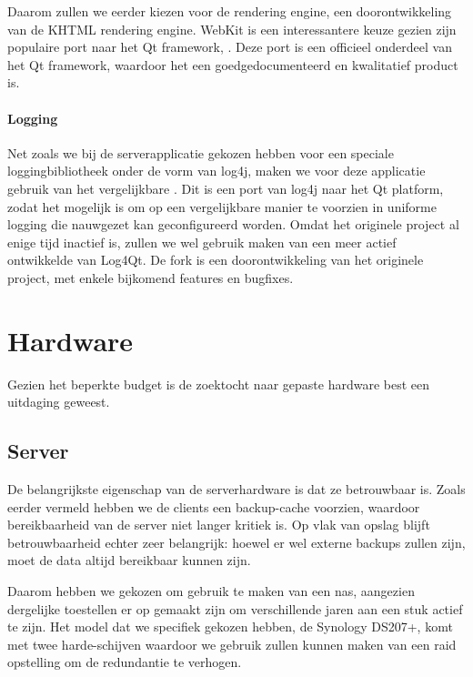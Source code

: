 Daarom zullen we eerder kiezen voor de  rendering engine, een doorontwikkeling van de KHTML rendering engine. WebKit is een interessantere keuze gezien zijn populaire port naar het Qt framework, . Deze port is een officieel onderdeel van het Qt framework, waardoor het een goedgedocumenteerd en kwalitatief product is.

\subsubsection{Logging}

Net zoals we bij de serverapplicatie gekozen hebben voor een speciale loggingbibliotheek onder de vorm van log4j, maken we voor deze applicatie gebruik van het vergelijkbare . Dit is een port van log4j naar het Qt platform, zodat het mogelijk is om op een vergelijkbare manier te voorzien in uniforme logging die nauwgezet kan geconfigureerd worden. Omdat het originele project al enige tijd inactief is, zullen we wel gebruik maken van een meer actief ontwikkelde  van Log4Qt. De fork is een doorontwikkeling van het originele project, met enkele bijkomend features en bugfixes.


%
%

\chapter{Hardware}
\label{ontwerp:hardware}

Gezien het beperkte budget is de zoektocht naar gepaste hardware best een uitdaging geweest.

\section{Server}
\label{ontwerp:hardware:server}

De belangrijkste eigenschap van de serverhardware is dat ze betrouwbaar is. Zoals eerder vermeld hebben we de clients een backup-cache voorzien, waardoor bereikbaarheid van de server niet langer kritiek is. Op vlak van opslag blijft betrouwbaarheid echter zeer belangrijk: hoewel er wel externe backups zullen zijn, moet de data altijd bereikbaar kunnen zijn.

Daarom hebben we gekozen om gebruik te maken van een \ac{nas}, aangezien dergelijke toestellen er op gemaakt zijn om verschillende jaren aan een stuk actief te zijn. Het model dat we specifiek gekozen hebben, de Synology DS207+, komt met twee harde-schijven waardoor we gebruik zullen kunnen maken van een \ac{raid} opstelling om de redundantie te verhogen.

